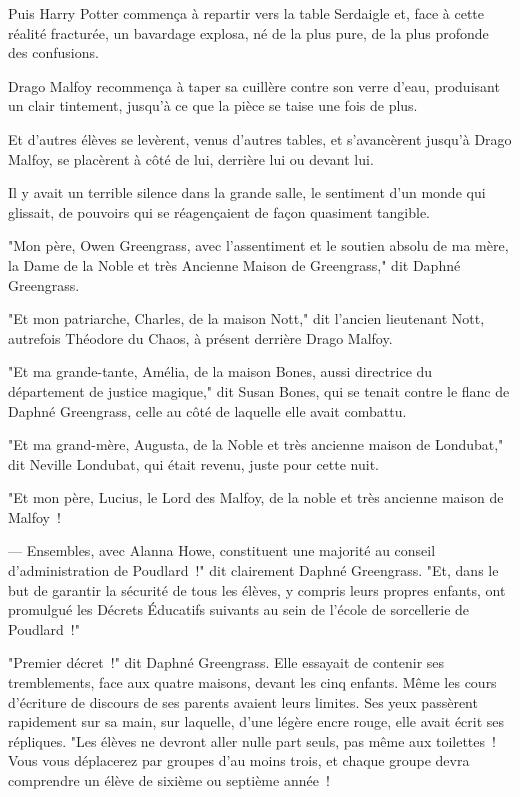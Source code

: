 Puis Harry Potter commença à repartir vers la table Serdaigle et, face à cette réalité fracturée, un bavardage explosa, né de la plus pure, de la plus profonde des confusions.

Drago Malfoy recommença à taper sa cuillère contre son verre d'eau, produisant un clair tintement, jusqu'à ce que la pièce se taise une fois de plus.

Et d'autres élèves se levèrent, venus d'autres tables, et s'avancèrent jusqu'à Drago Malfoy, se placèrent à côté de lui, derrière lui ou devant lui.

Il y avait un terrible silence dans la grande salle, le sentiment d'un monde qui glissait, de pouvoirs qui se réagençaient de façon quasiment tangible.

"Mon père, Owen Greengrass, avec l'assentiment et le soutien absolu de ma mère, la Dame de la Noble et très Ancienne Maison de Greengrass," dit Daphné Greengrass.

"Et mon patriarche, Charles, de la maison Nott," dit l'ancien lieutenant Nott, autrefois Théodore du Chaos, à présent derrière Drago Malfoy.

"Et ma grande-tante, Amélia, de la maison Bones, aussi directrice du département de justice magique," dit Susan Bones, qui se tenait contre le flanc de Daphné Greengrass, celle au côté de laquelle elle avait combattu.

"Et ma grand-mère, Augusta, de la Noble et très ancienne maison de Londubat," dit Neville Londubat, qui était revenu, juste pour cette nuit.

"Et mon père, Lucius, le Lord des Malfoy, de la noble et très ancienne maison de Malfoy~!

--- Ensembles, avec Alanna Howe, constituent une majorité au conseil d'administration de Poudlard~!" dit clairement Daphné Greengrass. "Et, dans le but de garantir la sécurité de tous les élèves, y compris leurs propres enfants, ont promulgué les Décrets Éducatifs suivants au sein de l'école de sorcellerie de Poudlard~!"

\later

"Premier décret~!" dit Daphné Greengrass. Elle essayait de contenir ses tremblements, face aux quatre maisons, devant les cinq enfants. Même les cours d'écriture de discours de ses parents avaient leurs limites. Ses yeux passèrent rapidement sur sa main, sur laquelle, d'une légère encre rouge, elle avait écrit ses répliques. "Les élèves ne devront aller nulle part seuls, pas même aux toilettes~! Vous vous déplacerez par groupes d'au moins trois, et chaque groupe devra comprendre un élève de sixième ou septième année~!

